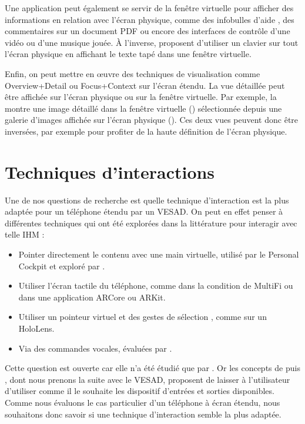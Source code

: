 Une application peut également se servir de la fenêtre virtuelle pour afficher des informations en relation avec l'écran physique, comme des infobulles d'aide , des commentaires sur un document PDF ou encore des interfaces de contrôle d'une vidéo ou d'une musique jouée. À l'inverse, \cite{Grubert2015} proposent d'utiliser un clavier sur tout l'écran physique en affichant le texte tapé dans une fenêtre virtuelle.

Enfin, on peut mettre en \oe uvre des techniques de visualisation comme Overview+Detail ou Focus+Context sur l'écran étendu. La vue détaillée peut être affichée sur l'écran physique ou sur la fenêtre virtuelle. Par exemple, la  montre une image détaillé dans la fenêtre virtuelle () sélectionnée depuis une galerie d'images affichée sur l'écran physique (). Ces deux vues peuvent donc être inversées, par exemple pour profiter de la haute définition de l'écran physique.


\section{Techniques d'interactions}
\label{sec:concept_interaction_techniques}

Une de nos questions de recherche  est quelle technique d'interaction est la plus adaptée pour un téléphone étendu par un VESAD. On peut en effet penser à différentes techniques qui ont été explorées dans la littérature pour interagir avec telle IHM :

\begin{itemize}
  \item Pointer directement le contenu avec une main virtuelle, utilisé par le Personal Cockpit \cite{Ens2014} et exploré par \cite{Piumsomboon2013}.
  \item Utiliser l'écran tactile du téléphone, comme dans la condition  de MultiFi \citep{Grubert2015} ou dans une application ARCore ou ARKit.
  \item Utiliser un pointeur virtuel et des gestes de sélection \cite{Wilson2006}, comme sur un HoloLens.
  \item Via des commandes vocales, évaluées par \cite{Piumsomboon2014}.
\end{itemize}
\bigskip

Cette question est ouverte car elle n'a été étudié que par \cite{Grubert2015}. Or les concepts de \cite{Serrano2015} puis \cite{Serrano2015a}, dont nous prenons la suite avec le VESAD, proposent de laisser à l'utilisateur d'utiliser comme il le souhaite les dispositif d'entrées et sorties disponibles. Comme nous évaluons le cas particulier d'un téléphone à écran étendu, nous souhaitons donc savoir si une technique d'interaction semble la plus adaptée.


